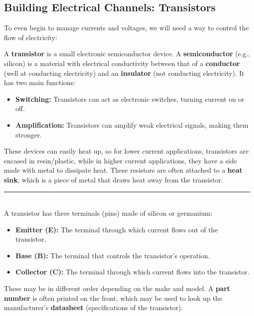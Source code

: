 \newpage 

\subsection{Building Electrical Channels: Transistors}

\noindent
To even begin to manage currents and voltages, we will need a way to control the flow of electricity:

\begin{Def}[Transistor]

    A \textbf{transistor} is a small electronic semiconductor device. A \textbf{semiconductor} (e.g., silicon) is a material with electrical 
    conductivity between that of a \textbf{conductor} (well at conducting electricity) and an \textbf{insulator}
    (not conducting electricity). It has two main functions:
    \begin{itemize}
        \item \textbf{Switching:} Transistors can act as electronic switches, turning current on or off.
        \item \textbf{Amplification:} Transistors can amplify weak electrical signals, making them stronger.
    \end{itemize}

    \noindent
    These devices can easily heat up, so for lower current applications, transistors are encased in resin/plastic,
    while in higher current applications, they have a side made with metal to dissipate heat. These resistors
    are often attached to a \textbf{heat sink}, which is a piece of metal that draws heat away from the transistor.\\
    \noindent
    \rule{\textwidth}{0.4pt}\\

    \noindent
    A transistor has three terminals (pins) made of silicon or germanium:
    \begin{itemize}
        \item \textbf{Emitter (E):} The terminal through which current flows out of the transistor.
        \item \textbf{Base (B):} The terminal that controls the transistor's operation.
        \item \textbf{Collector (C):} The terminal through which current flows into the transistor.
    \end{itemize}
    \medskip
    \noindent
    These may be in different order depending on the make and model. A \textbf{part number} is often printed on the front, which may be 
    used to look up the manufacturer's \textbf{datasheet} (specifications of the transistor).
\end{Def}

